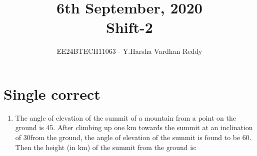 \documentclass[journal,,12pt,onecolumn]{IEEEtran}
\theoremstyle{remark}
\begin{document}

\vspace{3cm}

\title{6th September, 2020\\Shift-2}
\author{EE24BTECH11063 - Y.Harsha Vardhan Reddy}
\maketitle

\bigskip

\renewcommand{\thefigure}{\theenumi}
\renewcommand{\thetable}{\theenumi}

\section*{Single correct}
\begin{enumerate}
    \item The angle of elevation of the summit of a mountain from a point on the ground is 45\degree . After climbing up one km towards the summit at an inclination of 30\degree from the ground, the angle of elevation of the summit is found to be 60\degree. Then the height (in km) of the summit from the ground is:
    \begin{enumerate}
    

\end{enumerate}
\end{enumerate}
\end{document}
